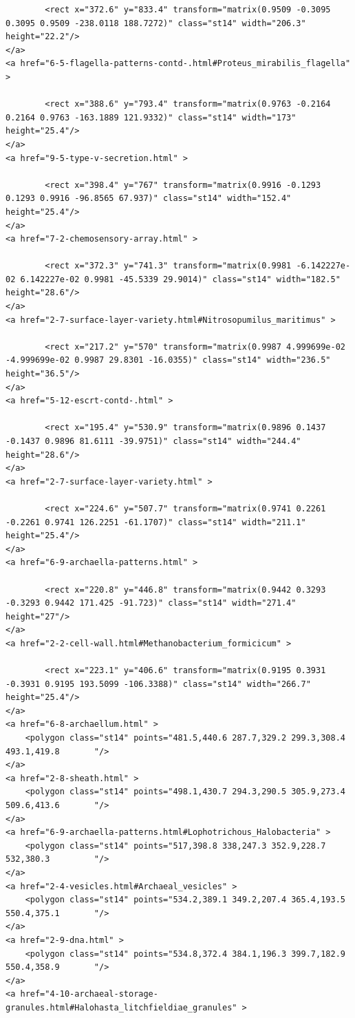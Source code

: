 \documentclass[]{tufte-book}
\begin{document}
\begin{verbatim}
        <rect x="372.6" y="833.4" transform="matrix(0.9509 -0.3095 0.3095 0.9509 -238.0118 188.7272)" class="st14" width="206.3" height="22.2"/>
</a>
<a href="6-5-flagella-patterns-contd-.html#Proteus_mirabilis_flagella" >

        <rect x="388.6" y="793.4" transform="matrix(0.9763 -0.2164 0.2164 0.9763 -163.1889 121.9332)" class="st14" width="173" height="25.4"/>
</a>
<a href="9-5-type-v-secretion.html" >

        <rect x="398.4" y="767" transform="matrix(0.9916 -0.1293 0.1293 0.9916 -96.8565 67.937)" class="st14" width="152.4" height="25.4"/>
</a>
<a href="7-2-chemosensory-array.html" >

        <rect x="372.3" y="741.3" transform="matrix(0.9981 -6.142227e-02 6.142227e-02 0.9981 -45.5339 29.9014)" class="st14" width="182.5" height="28.6"/>
</a>
<a href="2-7-surface-layer-variety.html#Nitrosopumilus_maritimus" >

        <rect x="217.2" y="570" transform="matrix(0.9987 4.999699e-02 -4.999699e-02 0.9987 29.8301 -16.0355)" class="st14" width="236.5" height="36.5"/>
</a>
<a href="5-12-escrt-contd-.html" >

        <rect x="195.4" y="530.9" transform="matrix(0.9896 0.1437 -0.1437 0.9896 81.6111 -39.9751)" class="st14" width="244.4" height="28.6"/>
</a>
<a href="2-7-surface-layer-variety.html" >

        <rect x="224.6" y="507.7" transform="matrix(0.9741 0.2261 -0.2261 0.9741 126.2251 -61.1707)" class="st14" width="211.1" height="25.4"/>
</a>
<a href="6-9-archaella-patterns.html" >

        <rect x="220.8" y="446.8" transform="matrix(0.9442 0.3293 -0.3293 0.9442 171.425 -91.723)" class="st14" width="271.4" height="27"/>
</a>
<a href="2-2-cell-wall.html#Methanobacterium_formicicum" >

        <rect x="223.1" y="406.6" transform="matrix(0.9195 0.3931 -0.3931 0.9195 193.5099 -106.3388)" class="st14" width="266.7" height="25.4"/>
</a>
<a href="6-8-archaellum.html" >
    <polygon class="st14" points="481.5,440.6 287.7,329.2 299.3,308.4 493.1,419.8       "/>
</a>
<a href="2-8-sheath.html" >
    <polygon class="st14" points="498.1,430.7 294.3,290.5 305.9,273.4 509.6,413.6       "/>
</a>
<a href="6-9-archaella-patterns.html#Lophotrichous_Halobacteria" >
    <polygon class="st14" points="517,398.8 338,247.3 352.9,228.7 532,380.3         "/>
</a>
<a href="2-4-vesicles.html#Archaeal_vesicles" >
    <polygon class="st14" points="534.2,389.1 349.2,207.4 365.4,193.5 550.4,375.1       "/>
</a>
<a href="2-9-dna.html" >
    <polygon class="st14" points="534.8,372.4 384.1,196.3 399.7,182.9 550.4,358.9       "/>
</a>
<a href="4-10-archaeal-storage-granules.html#Halohasta_litchfieldiae_granules" >


\end{verbatim}
\end{document}
